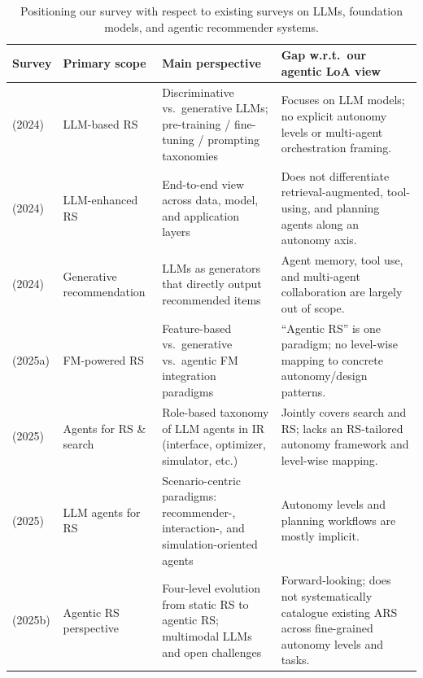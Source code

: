 \begin{table}[!t]
\small
  \caption{Positioning our survey with respect to existing surveys on LLMs, foundation models, and agentic recommender systems.}
  \label{tab:survey-comparison}
  \centering
  \begin{tabularx}{\linewidth}{@{}p{3.0cm}p{2.5cm}p{3.5cm}X@{}}
    \toprule
    \textbf{Survey} & \textbf{Primary scope} & \textbf{Main perspective} & \textbf{Gap w.r.t.\ our agentic LoA view} \\
    \midrule
    \citet{wu2024survey} (2024) &
    LLM-based RS &
    Discriminative vs.\ generative LLMs; pre-training / fine-tuning / prompting taxonomies &
    Focuses on LLM models; no explicit autonomy levels or multi-agent orchestration framing. \\
    \addlinespace[0.3em]
    \citet{zhao2024recommender} (2024) &
    LLM-enhanced RS &
    End-to-end view across data, model, and application layers &
    Does not differentiate retrieval-augmented, tool-using, and planning agents along an autonomy axis. \\
    \addlinespace[0.3em]
    \citet{li2024large} (2024) &
    Generative recommendation &
    LLMs as generators that directly output recommended items &
    Agent memory, tool use, and multi-agent collaboration are largely out of scope. \\
    \addlinespace[0.3em]
    \citet{huang2025survey} (2025a) &
    FM-powered RS &
    Feature-based vs.\ generative vs.\ agentic FM integration paradigms &
    ``Agentic RS'' is one paradigm; no level-wise mapping to concrete autonomy/design patterns. \\
    \addlinespace[0.3em]
    \citet{zhang2025survey} (2025) &
    Agents for RS \& search &
    Role-based taxonomy of LLM agents in IR (interface, optimizer, simulator, etc.) &
    Jointly covers search and RS; lacks an RS-tailored autonomy framework and level-wise mapping. \\
    \addlinespace[0.3em]
    \citet{peng2025survey} (2025) &
    LLM agents for RS &
    Scenario-centric paradigms: recommender-, interaction-, and simulation-oriented agents &
    Autonomy levels and planning workflows are mostly implicit. \\
    \addlinespace[0.3em]
    \citet{huang2025towards} (2025b) &
    Agentic RS perspective &
    Four-level evolution from static RS to agentic RS; multimodal LLMs and open challenges &
    Forward-looking; does not systematically catalogue existing ARS across fine-grained autonomy levels and tasks. \\

\end{tabularx}
\end{table}
